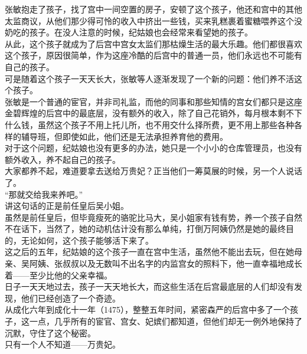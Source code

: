 \begin{multicols}{\theparacolNo}
张敏抱走了孩子，找了宫中一间空置的房子，安顿了这个孩子，他还和宫中的其他太监商议，从他们那少得可怜的收入中挤出一些钱，买来乳糕裹着蜜糖喂养这个没奶吃的孩子。在没人注意的时候，纪姑娘也会经常来看望她的孩子。\\

从此，这个孩子就成为了后宫中宫女太监们那枯燥生活的最大乐趣。他们都很喜欢这个孩子，原因很简单，作为这座冷酷的后宫中的普通一员，他们永远也不可能有自己的孩子。\\

可是随着这个孩子一天天长大，张敏等人逐渐发现了一个新的问题：他们养不活这个孩子。\\

张敏是一个普通的宦官，并非司礼监，而他的同事和那些知情的宫女们都只是这座金碧辉煌的后宫中的最底层，没有额外的收入，除了自己花销外，每月根本剩不下什么钱，虽然这个孩子不用上托儿所，也不用交什么择所费，更不用上那些各种各样的辅导班，但即使如此，他们还是无法承担养育他的费用。\\

对于这个问题，纪姑娘也没有更多的办法，她只是一个小小的仓库管理员，也没有额外收入，养不起自己的孩子。\\

大家都养不起，难道要拿去送给万贵妃？正当他们一筹莫展的时候，另一个人说话了。\\

“那就交给我来养吧。”\\

讲这句话的正是前任皇后吴小姐。\\

虽然是前任皇后，但毕竟瘦死的骆驼比马大，吴小姐家有钱有势，养一个孩子自然不在话下，当然了，她的动机估计没有那么单纯，打倒万阿姨仍然是她的最终目的，无论如何，这个孩子能够活下来了。\\

这之后的五年，纪姑娘的这个孩子一直在宫中生活，虽然他不能出去玩，但在她母亲、吴阿姨、张叔叔以及无数叫不出名字的内监宫女的照料下，他一直幸福地成长着——至少比他的父亲幸福。\\

日子一天天地过去，孩子一天天地长大，而这些生活在后宫最底层的人们却没有发现，他们已经创造了一个奇迹。\\

从成化六年到成化十一年（1475），整整五年时间，紧密森严的后宫中多了一个孩子，这一点，几乎所有的宦官、宫女、妃嫔们都知道，但他们却无一例外地保持了沉默，守住了这个秘密。\\

只有一个人不知道——万贵妃。\\


\end{multicols}
